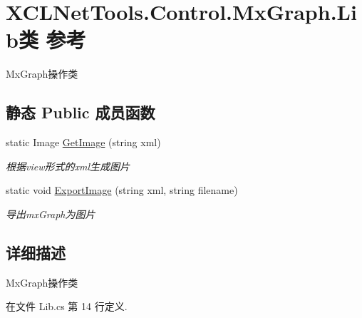 \hypertarget{class_x_c_l_net_tools_1_1_control_1_1_mx_graph_1_1_lib}{\section{X\-C\-L\-Net\-Tools.\-Control.\-Mx\-Graph.\-Lib类 参考}
\label{class_x_c_l_net_tools_1_1_control_1_1_mx_graph_1_1_lib}
}


Mx\-Graph操作类  


\subsection*{静态 Public 成员函数}
\begin{DoxyCompactItemize}
\item 
static Image \hyperlink{class_x_c_l_net_tools_1_1_control_1_1_mx_graph_1_1_lib_abff455d51f61485d6bf26e0133af6000}{Get\-Image} (string xml)
\begin{DoxyCompactList}\small\item\em 根据view形式的xml生成图片 \end{DoxyCompactList}\item 
static void \hyperlink{class_x_c_l_net_tools_1_1_control_1_1_mx_graph_1_1_lib_ad6b09c60b11a1f51a6bf45cc3bde1b88}{Export\-Image} (string xml, string filename)
\begin{DoxyCompactList}\small\item\em 导出mx\-Graph为图片 \end{DoxyCompactList}\end{DoxyCompactItemize}


\subsection{详细描述}
Mx\-Graph操作类 



在文件 Lib.\-cs 第 14 行定义.



